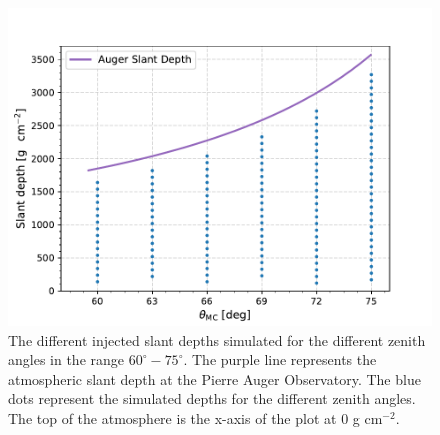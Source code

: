 \begin{figure}[t!]
  \centering
  \includegraphics[width=14.5cm]{thesis_figures/Nu_analysis/AugerSlantDepth.pdf}
  \caption{The different injected slant depths simulated for the different zenith angles in the range $60^{\circ}-75^{\circ}$. The purple line represents the atmospheric slant depth at the Pierre Auger Observatory. The blue dots represent the simulated depths for the different zenith angles. The top of the atmosphere is the x-axis of the plot at 0 g cm$^{-2}$.}
  \label{fig:Salant_depth_sim}
\end{figure}

